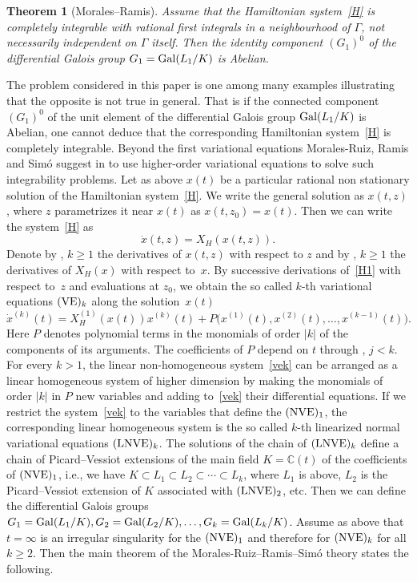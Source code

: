 \documentclass[10pt,a4paper]{amsart}
\numberwithin{equation}{section}
\newtheorem{Theorem}{Theorem}[section]
\begin{document}
\begin{Theorem}[Morales--Ramis]%
 Assume that the Hamiltonian system~\eqref{H} is completely integrable with rational first integrals in a
 neighbourhood of $\Gamma$, not necessarily independent on $\Gamma$ itself. Then the identity component $(G_1)^0$ of the
 differential Galois group $G_1={\rm Gal}(L_1/K)$ is Abelian.
 \end{Theorem}

 The problem considered in this paper is one among many examples illustrating that the opposite is not true in general.
 That is if the connected component $(G_1)^0$ of the unit element of the differential Galois group ${\rm Gal}(L_1/K)$ is
 Abelian, one cannot deduce that the corresponding Hamiltonian system~\eqref{H} is completely integrable. Beyond the first
 variational equations Morales-Ruiz, Ramis and Sim\'{o} suggest in \cite{MRS} to use higher-order variational equations
 to solve such integrability problems. Let as above $x(t)$ be a particular rational non stationary solution of the Hamiltonian
 system~\eqref{H}. We write the general solution as $x(t, z)$, where $z$ parametrizes it near $x(t)$ as $x(t, z_0)=x(t)$.
 Then we can write the system~\eqref{H} as
 \begin{equation}
 \dot{x}(t, z)=X_H(x(t, z)) .\label{H1}
 \end{equation}
 Denote by , $k \geq 1$ the derivatives of $x(t, z)$ with respect to $z$ and by
 , $k \geq 1$ the derivatives of $X_H(x)$ with respect to~$x$. By successive derivations of~\eqref{H1} with respect
 to~$z$ and evaluations at $z_0$, we obtain the so called $k$-th variational equations $({\rm VE})_k$ along the solution~$x(t)$%
 \begin{equation}
 \dot{x}^{(k)}(t)=X^{(1)}_H(x(t)) x^{(k)}(t) + P\bigl(x^{(1)}(t), x^{(2)}(t), \dots, x^{(k-1)}(t)\bigr) .\label{vek}
 \end{equation}
 Here $P$ denotes polynomial terms in the monomials of order $|k|$ of the components of its arguments. The coefficients
 of $P$ depend on $t$ through , $j < k$. For every $k > 1$, the linear non-homogeneous system~\eqref{vek}
 can be arranged as a linear homogeneous system of higher dimension by making the monomials of order $|k|$ in $P$ new
 variables and adding to~\eqref{vek} their differential equations. If we restrict the system~\eqref{vek} to the variables
 that define the $({\rm NVE})_1$, the corresponding linear homogeneous system is the so called $k$-th linearized
 normal variational equations $({\rm LNVE})_k$. The solutions of the chain of $({\rm LNVE})_k$ define a chain
 of Picard--Vessiot extensions of the main field $K=\mathbb{C}(t)$ of the coefficients of $({\rm NVE})_1$, i.e., we have
 $K \subset L_1 \subset L_2 \subset \cdots \subset L_k$, where $L_1$ is above, $L_2$ is the Picard--Vessiot extension
 of $K$ associated with $({\rm LNVE})_2$, etc. Then we can define the differential Galois groups
 $G_1={\rm Gal}(L_1/K), G_2={\rm Gal}(L_2/K), \dots, G_k={\rm Gal}(L_k/K)$. Assume as above that $t=\infty$ is an irregular singularity for the $({\rm NVE})_1$
 and therefore for $({\rm NVE})_k$ for all $k \geq 2$. Then the main theorem of the
 Morales-Ruiz--Ramis--Sim\'{o} theory states the following.
\end{document}
